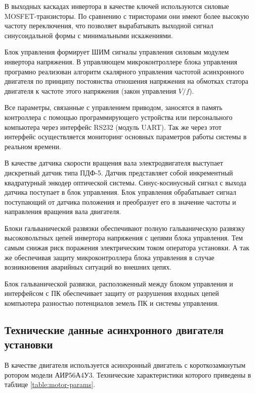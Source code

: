         В выходных каскадах инвертора в качестве ключей используются силовые
        MOSFET-транзисторы. По сравнению с тиристорами они имеют более высокую
        частоту переключения, что позволяет вырабатывать выходной сигнал
        синусоидальной формы с минимальными искажениями. 

        Блок управления формирует ШИМ сигналы управления силовым модулем
        инвертора напряжения. В управляющем микроконтроллере блока управления
        програмно реализован алгоритм скалярного управления частотой
        асинхронного двигателя по принципу постоянства отношения напряжения на
        обмотках статора двигателя к частоте этого напряжения (закон управления
        $V/f$).
        
        Все параметры, связанные с управлением приводом, заносятся в память
        контроллера с помощью программирующего устройства или персонального
        компьютера через интерфейс RS232 (модуль UART). Так же через этот
        интерфейс осуществляется мониторинг основных параметров работы системы
        в реальном времени.

        В качестве датчика скорости вращения вала электродвигателя выступает
        дискретный датчик типа ПДФ-5. Датчик представляет собой инкрементный
        квадратурный энкодер оптической системы. Синус-косинусный сигнал с
        выхода датчика поступает в блок управления. Блок управления
        обрабатывает сигнал поступающий от датчика положения и преобразует его
        в значение частоты и направления вращения вала двигателя.

        Блоки гальванической развязки обеспечивают полную гальваническую
        развязку высоковольтных цепей инвертора напряжения с цепями блока
        управления. Тем самым снижая риск поражения электрическим током
        оператора установки. А так же обеспечивая защиту микроконтроллера блока
        управления в случае возникновения аварийных ситуаций во внешних цепях.

        Блок гальванической развязки, расположенный между блоком управления и
        интерфейсом с ПК обеспечивает защиту от разрушения входных цепей
        компъютера разностью потенциалов земель ПК и системы управления.

    \subsection{Технические данные асинхронного двигателя установки}

        В качестве двигателя используется асинхронный двигатель с
        короткозамкнутым ротором модели АИР56А4У3. Технические характеристики
        которого приведены в таблице \ref{table:motor-params}.
         

